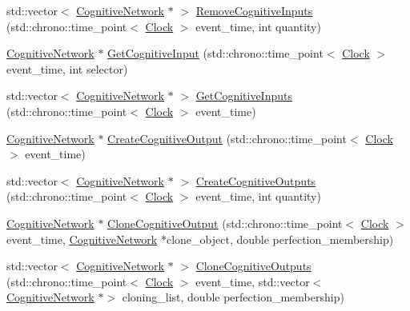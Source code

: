 \begin{DoxyCompactItemize}
\item 
std\+::vector$<$ \mbox{\hyperlink{class_cognitive_network}{Cognitive\+Network}} $\ast$ $>$ \mbox{\hyperlink{class_cognitive_network_aaaf93e7c732b1e1e81060f82ff73c93a}{Remove\+Cognitive\+Inputs}} (std\+::chrono\+::time\+\_\+point$<$ \mbox{\hyperlink{universe_8h_a0ef8d951d1ca5ab3cfaf7ab4c7a6fd80}{Clock}} $>$ event\+\_\+time, int quantity)
\item 
\mbox{\hyperlink{class_cognitive_network}{Cognitive\+Network}} $\ast$ \mbox{\hyperlink{class_cognitive_network_a2ff68a0d11cdb29af2f05a69a11911a4}{Get\+Cognitive\+Input}} (std\+::chrono\+::time\+\_\+point$<$ \mbox{\hyperlink{universe_8h_a0ef8d951d1ca5ab3cfaf7ab4c7a6fd80}{Clock}} $>$ event\+\_\+time, int selector)
\item 
std\+::vector$<$ \mbox{\hyperlink{class_cognitive_network}{Cognitive\+Network}} $\ast$ $>$ \mbox{\hyperlink{class_cognitive_network_a92b896643b881e4030401e0f7fd256bf}{Get\+Cognitive\+Inputs}} (std\+::chrono\+::time\+\_\+point$<$ \mbox{\hyperlink{universe_8h_a0ef8d951d1ca5ab3cfaf7ab4c7a6fd80}{Clock}} $>$ event\+\_\+time)
\item 
\mbox{\hyperlink{class_cognitive_network}{Cognitive\+Network}} $\ast$ \mbox{\hyperlink{class_cognitive_network_ac220350499bd323bd8f24ff0050cd60d}{Create\+Cognitive\+Output}} (std\+::chrono\+::time\+\_\+point$<$ \mbox{\hyperlink{universe_8h_a0ef8d951d1ca5ab3cfaf7ab4c7a6fd80}{Clock}} $>$ event\+\_\+time)
\item 
std\+::vector$<$ \mbox{\hyperlink{class_cognitive_network}{Cognitive\+Network}} $\ast$ $>$ \mbox{\hyperlink{class_cognitive_network_a002df11f4389a122fc140c186ab665c9}{Create\+Cognitive\+Outputs}} (std\+::chrono\+::time\+\_\+point$<$ \mbox{\hyperlink{universe_8h_a0ef8d951d1ca5ab3cfaf7ab4c7a6fd80}{Clock}} $>$ event\+\_\+time, int quantity)
\item 
\mbox{\hyperlink{class_cognitive_network}{Cognitive\+Network}} $\ast$ \mbox{\hyperlink{class_cognitive_network_ab24f74115c11275f365245a4bb826c91}{Clone\+Cognitive\+Output}} (std\+::chrono\+::time\+\_\+point$<$ \mbox{\hyperlink{universe_8h_a0ef8d951d1ca5ab3cfaf7ab4c7a6fd80}{Clock}} $>$ event\+\_\+time, \mbox{\hyperlink{class_cognitive_network}{Cognitive\+Network}} $\ast$clone\+\_\+object, double perfection\+\_\+membership)
\item 
std\+::vector$<$ \mbox{\hyperlink{class_cognitive_network}{Cognitive\+Network}} $\ast$ $>$ \mbox{\hyperlink{class_cognitive_network_a5734aa5378e9b701dca5e98017c1ea35}{Clone\+Cognitive\+Outputs}} (std\+::chrono\+::time\+\_\+point$<$ \mbox{\hyperlink{universe_8h_a0ef8d951d1ca5ab3cfaf7ab4c7a6fd80}{Clock}} $>$ event\+\_\+time, std\+::vector$<$ \mbox{\hyperlink{class_cognitive_network}{Cognitive\+Network}} $\ast$$>$ cloning\+\_\+list, double perfection\+\_\+membership)
$$
\end{DoxyCompactItemize}
